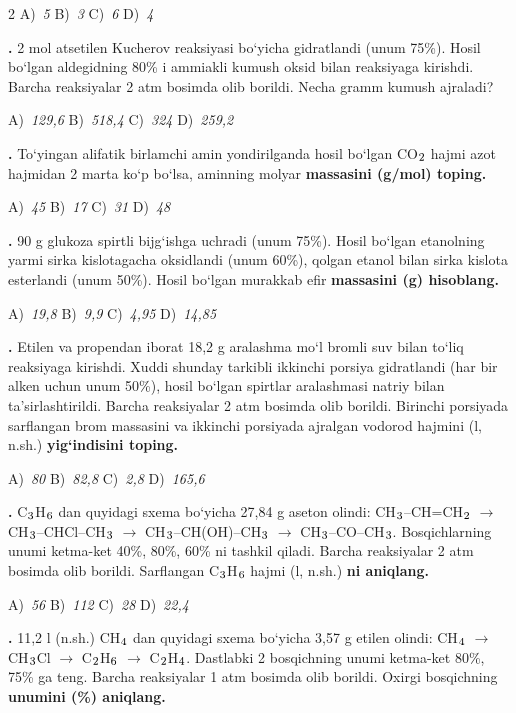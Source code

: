 \documentclass[11pt,a4paper]{article}
\renewcommand{\textsubscript}[1]{\ensuremath{_{\text{\fontsize{8}{8}\selectfont #1}}}}
\newcommand{\qn}[1]{\textbf{\fontsize{11.5}{13}\selectfont #1}}
\newcommand{\qsep}{\par\vspace{13pt}}
\begin{document}
\begin{multicols}{2}
\noindent A)~\textsl{5} \hfill B)~\textsl{3} \hfill C)~\textsl{6} \hfill D)~\textsl{4}\par
\qsep
\noindent\qn{24.} 2 mol atsetilen Kucherov reaksiyasi bo`yicha gidratlandi (unum 75\%). Hosil bo`lgan aldegidning 80\% i ammiakli kumush oksid bilan reaksiyaga kirishdi. Barcha reaksiyalar 2 atm bosimda olib borildi. Necha gramm kumush ajraladi?

\noindent A)~\textsl{129,6} \hfill B)~\textsl{518,4} \hfill C)~\textsl{324} \hfill D)~\textsl{259,2}\par
\qsep
\noindent\qn{25.} To`yingan alifatik birlamchi amin yondirilganda hosil bo`lgan CO\textsubscript{2} hajmi azot hajmidan 2 marta ko`p bo`lsa, aminning molyar \textbf{massasini (g/mol) toping.}

\noindent A)~\textsl{45} \hfill B)~\textsl{17} \hfill C)~\textsl{31} \hfill D)~\textsl{48}\par
\qsep
\noindent\qn{26.} 90 g glukoza spirtli bijg`ishga uchradi (unum 75\%). Hosil bo`lgan etanolning yarmi sirka kislotagacha oksidlandi (unum 60\%), qolgan etanol bilan sirka kislota esterlandi (unum 50\%). Hosil bo`lgan murakkab efir \textbf{massasini (g) hisoblang.}

\noindent A)~\textsl{19,8} \hfill B)~\textsl{9,9} \hfill C)~\textsl{4,95} \hfill D)~\textsl{14,85}\par
\qsep
\noindent\qn{27.} Etilen va propendan iborat 18,2 g aralashma mo`l bromli suv bilan to`liq reaksiyaga kirishdi. Xuddi shunday tarkibli ikkinchi porsiya gidratlandi (har bir alken uchun unum 50\%), hosil bo`lgan spirtlar aralashmasi natriy bilan ta'sirlashtirildi. Barcha reaksiyalar 2 atm bosimda olib borildi. Birinchi porsiyada sarflangan brom massasini va ikkinchi porsiyada ajralgan vodorod hajmini (l, n.sh.) \textbf{yig`indisini toping.}

\noindent A)~\textsl{80} \hfill B)~\textsl{82,8} \hfill C)~\textsl{2,8} \hfill D)~\textsl{165,6}\par
\qsep
\noindent\qn{28.} C\textsubscript{3}H\textsubscript{6} dan quyidagi sxema bo`yicha 27,84 g aseton olindi: CH\textsubscript{3}--CH=CH\textsubscript{2} $\to$ CH\textsubscript{3}--CHCl--CH\textsubscript{3} $\to$ CH\textsubscript{3}--CH(OH)--CH\textsubscript{3} $\to$ CH\textsubscript{3}--CO--CH\textsubscript{3}. Bosqichlarning unumi ketma-ket 40\%, 80\%, 60\% ni tashkil qiladi. Barcha reaksiyalar 2 atm bosimda olib borildi. Sarflangan C\textsubscript{3}H\textsubscript{6} hajmi (l, n.sh.) \textbf{ni aniqlang.}

\noindent A)~\textsl{56} \hfill B)~\textsl{112} \hfill C)~\textsl{28} \hfill D)~\textsl{22,4}\par
\qsep
\noindent\qn{29.} 11,2 l (n.sh.) CH\textsubscript{4} dan quyidagi sxema bo`yicha 3,57 g etilen olindi: CH\textsubscript{4} $\to$ CH\textsubscript{3}Cl $\to$ C\textsubscript{2}H\textsubscript{6} $\to$ C\textsubscript{2}H\textsubscript{4}. Dastlabki 2 bosqichning unumi ketma-ket 80\%, 75\% ga teng. Barcha reaksiyalar 1 atm bosimda olib borildi. Oxirgi bosqichning \textbf{unumini (\%) aniqlang.}


\end{multicols}
\end{document}
